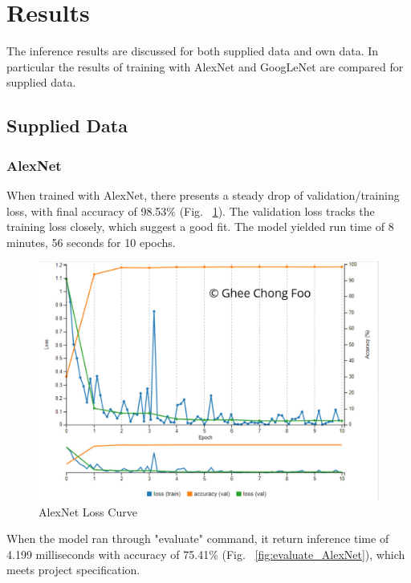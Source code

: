 \documentclass[10pt,journal,compsoc]{IEEEtran}
\begin{document}
\newpage
\section{Results}
The inference results are discussed for both supplied data and own data.  In particular the results of training with AlexNet and GoogLeNet are compared for supplied data.

\subsection{Supplied Data}
\subsubsection{AlexNet}
When trained with AlexNet, there presents a steady drop of validation/training loss, with final accuracy of 98.53\% (Fig. ~\ref{fig:Alex_Epoch10_Batch25_lr001}).  The validation loss tracks the training loss closely, which suggest a good fit.  The model yielded run time of 8 minutes, 56 seconds for 10 epochs.
\begin{figure}[thpb]
      \centering
      \includegraphics[width=\linewidth]{Alex_Epoch10_Batch25_lr001}
      \caption{AlexNet Loss Curve}
      \label{fig:Alex_Epoch10_Batch25_lr001}
\end{figure}

When the model ran through "evaluate" command, it return inference time of 4.199 milliseconds with accuracy of 75.41\% (Fig. ~\ref{fig:evaluate_AlexNet}), which meets project specification.
\end{document}
